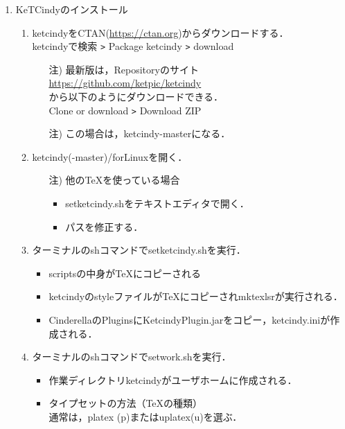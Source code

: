\documentclass{ujarticle}
\begin{document}
\begin{enumerate}[\bf\large 1.]
\item KeTCindyのインストール
  \begin{enumerate}[(1)]
  \item ketcindyをCTAN(\url{https://ctan.org})からダウンロードする．\\
  \hspace*{10mm}ketcindyで検索 \verb|>| Package ketcindy \verb|>| download
    \begin{itemize}
    \item[注)]最新版は，Repositoryのサイト\\
        \hspace*{10mm}\url{https://github.com/ket­pic/ketcindy}\\
       から以下のようにダウンロードできる．\\
        \hspace*{10mm}Clone or download \verb|>| Download ZIP
    \item[注)]この場合は，ketcindy-masterになる．
    \end{itemize}
  \item ketcindy(-master)/forLinuxを開く．
    \begin{itemize}
    \item[注)]他のTeXを使っている場合
      \begin{itemize}
      \item setketcindy.shをテキストエディタで開く．
      \item パスを修正する．
      \end{itemize}
    \end{itemize}
  \item ターミナルのshコマンドでsetketcindy.shを実行．
    \begin{itemize}
    \item scriptsの中身がTeXにコピーされる
    \item ketcindyのstyleファイルがTeXにコピーされmktexlsrが実行される．
    \item CinderellaのPluginsにKetcindyPlugin.jarをコピー，ketcindy.iniが作成される．
    \end{itemize}
  \item ターミナルのshコマンドでsetwork.shを実行．
    \begin{itemize}
    \item 作業ディレクトリketcindyがユーザホームに作成される．
    \item タイプセットの方法（TeXの種類）\\
    \hspace*{10mm}通常は，platex (p)またはuplatex(u)を選ぶ．

\end{itemize}
\end{enumerate}
\end{enumerate}
\end{document}
